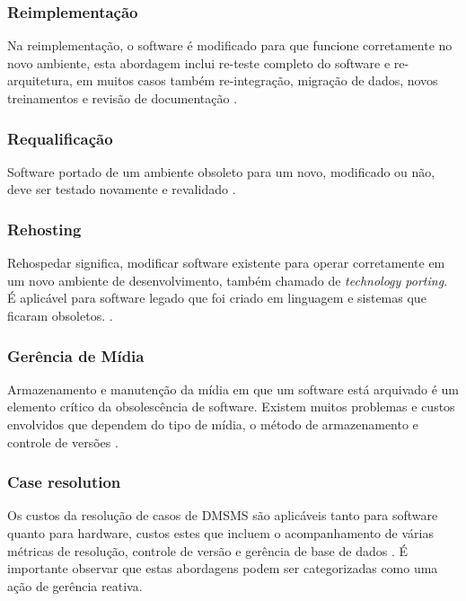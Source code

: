 \subsubsection{\esp Reimplementação }

Na reimplementação, o software é modificado para que funcione corretamente no novo ambiente, esta abordagem inclui re-teste completo do software e re-arquitetura, em muitos casos também re-integração, migração de dados, novos treinamentos e revisão de documentação \cite{sandborn2007}.

\subsubsection{\esp Requalificação }

Software portado de um ambiente obsoleto para um novo, modificado ou não, deve ser testado novamente e revalidado \cite{sandborn2007}.

\subsubsection{\esp Rehosting }

Rehospedar significa, modificar software existente para operar corretamente em um novo ambiente de desenvolvimento, também chamado de \textit{technology porting}. É aplicável para software legado que foi criado em linguagem e sistemas que ficaram obsoletos. \cite{sandborn2007}.

\subsubsection{\esp Gerência de Mídia }

Armazenamento e manutenção da mídia em que um software está arquivado é um elemento crítico da obsolescência de software. Existem muitos problemas e custos envolvidos que dependem do tipo de mídia, o método de armazenamento e controle de versões \cite{sandborn2007}. 

\subsubsection{\esp Case resolution }

Os custos da  resolução de casos de DMSMS são aplicáveis tanto para software quanto para hardware, custos estes que incluem o acompanhamento de várias métricas de resolução, controle de versão e gerência de base de dados \cite{sandborn2007}. É importante observar que estas abordagens podem ser categorizadas como uma ação de gerência reativa.

